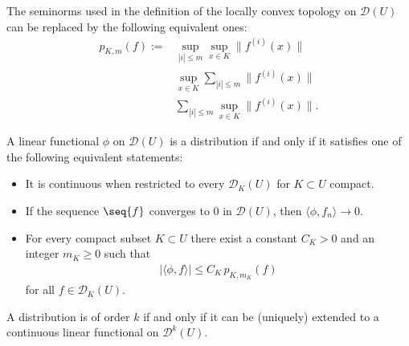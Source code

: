     \begin{property}
        The seminorms used in the definition of the locally convex topology on $\mathcal{D}(U)$ can be replaced by the following equivalent ones:
        \begin{align}
            p_{K,m}(f) := &\sup_{|i|\leq m}\sup_{x\in K}\|f^{(i)}(x)\|\label{distribution:D_seminorm}\\
            &\sup_{x\in K}\sum_{|i|\leq m}\|f^{(i)}(x)\|\\
            &\sum_{|i|\leq m}\sup_{x\in K}\|f^{(i)}(x)\|.
        \end{align}
    \end{property}

	\begin{property}
		A linear functional $\phi$ on $\mathcal{D}(U)$ is a distribution if and only if it satisfies one of the following equivalent statements:
		\begin{itemize}
            \item It is continuous when restricted to every $\mathcal{D}_K(U)$ for $K\subset U$ compact.
			\item If the sequence $\seq{f}$ converges to 0 in $\mathcal{D}(U)$, then $\langle\phi,f_n\rangle\longrightarrow0$.
			\item For every compact subset $K\subset U$ there exist a constant $C_K>0$ and an integer $m_K\geq0$ such that
			\begin{gather}
				|\langle\phi,f\rangle|\leq C_K\,p_{K,m_K}(f)
			\end{gather}
			for all $f\in\mathcal{D}_K(U)$.
		\end{itemize}
	\end{property}


	\begin{property}
		A distribution is of order $k$ if and only if it can be (uniquely) extended to a continuous linear functional on $\mathcal{D}^k(U)$.
	\end{property}

